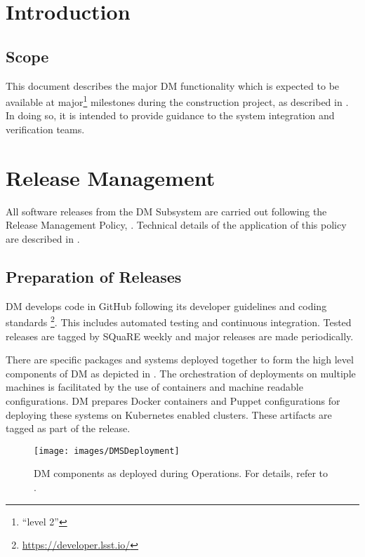 \section{Introduction}
\subsection{Scope}

This document describes the major DM functionality which is expected to be available at major\footnote{ ``level 2''} milestones during the construction project, as described in .
In doing so, it is intended to provide guidance to the system integration and verification teams.

\section{Release Management}\label{sect:relman}

All software releases from the DM Subsystem are carried out following the Release Management Policy, .
Technical details of the application of this policy are described in .

\subsection{Preparation of Releases}\label{sect:relprep}

DM develops code in GitHub following its developer guidelines and coding standards \footnote{\url{https://developer.lsst.io/}}.
This includes automated testing and continuous integration.
Tested releases are tagged by SQuaRE weekly and major releases are made periodically.

There are specific packages and systems deployed together to form the high level components of DM as depicted in .
The orchestration of deployments on multiple machines is facilitated by the use of containers and machine readable configurations.
DM prepares Docker containers and Puppet configurations for deploying these systems on Kubernetes enabled clusters.
These artifacts are tagged as part of the release.

\begin{figure}[htbp]
        \begin{center}
                \texttt{[image: images/DMSDeployment]}
                \caption{DM components as deployed during Operations.
                         For details, refer to .
                \label{fig:dmsdeploy}}
        \end{center}
\end{figure}

